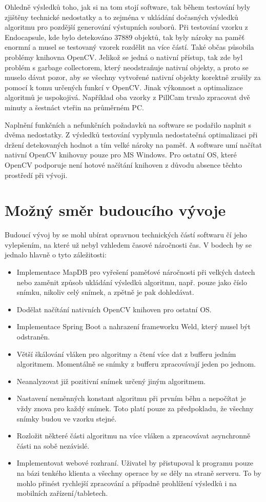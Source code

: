 Ohledně výsledků toho, jak si na tom stojí software, tak během testování byly zjištěny technické nedostatky a to zejména v ukládání dočasných výsledků algoritmu pro pozdější generování výstupních souborů. Při testování vzorku z Endocapsule, kde bylo detekováno 37889 objektů, tak byly nároky na paměť enormní a musel se testovaný vzorek rozdělit na více částí. Také občas působila problémy knihovna OpenCV. Jelikož se jedná o nativní přístup, tak zde byl problém s garbage collectorem, který neodstraňuje nativní objekty, a proto se muselo dávat pozor, aby se všechny vytvořené nativní objekty korektně zrušily za pomocí k tomu určených funkcí v OpenCV. Jinak výkonnost a optimalizace algoritmů je uspokojivá. Například oba vzorky z PillCam trvalo zpracovat dvě minuty a šestnáct vteřin na průměrném PC.

Naplnění funkčních a nefunkčních požadavků na software se podařilo naplnit s dvěma nedostatky. Z výsledků testování vyplynula nedostatečná optimalizaci při držení detekovaných hodnot a tím velké nároky na paměť. A software umí načítat nativní OpenCV knihovny pouze pro MS Windows. Pro ostatní OS, které OpenCV podporuje není hotové načítání knihoven z důvodu absence těchto prostředí při vývoji.
\section{Možný směr budoucího vývoje}
Budoucí vývoj by se mohl ubírat opravnou technických částí softwaru čí jeho vylepšením, na které už nebyl vzhledem časové náročnosti čas. V bodech by se jednalo hlavně o tyto záležitosti:
\begin{itemize}
	\item Implementace MapDB pro vyřešení paměťové náročnosti při velkých datech nebo zaměnit způsob ukládání výsledků algoritmu, např. pouze jako číslo snímku, nikoliv celý snímek, a zpětně je pak dohledávat.
	\item Dodělat načítání nativních OpenCV knihoven pro ostatní OS.
	\item Implementace Spring Boot a nahrazení frameworku Weld, který musel být odstraněn.
	\item Větší škálování vláken pro algoritmy a čtení více dat z bufferu jedním algoritmem. Momentálně se snímky z bufferu zpracovávají jeden po jednom.
	\item Neanalyzovat již pozitivní snímek určený jiným algoritmem.
	\item Nastavení neměnných konstant algoritmu při prvním běhu a nepočítat je vždy znova pro každý snímek. Toto platí pouze za předpokladu, že všechny snímky budou ve vzorku stejné. 
	\item Rozložit některé části algoritmu na více vláken a zpracovávat asynchronně části na sobě nezávislé.
	\item Implementovat webové rozhraní. Uživatel by přistupoval k programu pouze na bázi tenkého klienta a všechny operace by se děly na straně serveru. To by mohlo přinést rychlejší zpracování a případně prohlížení výsledků i na mobilních zařízení/tabletech.
\end{itemize}

